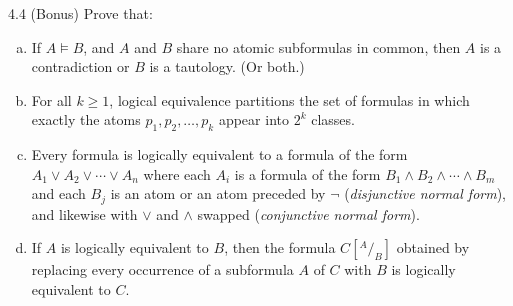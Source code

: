 \documentclass{article}
\begin{document}
\begin{prob}{4.4 (Bonus)}
    Prove that:
    \begin{enumerate}[a)]
    \item If $A \models B$, and $A$ and $B$ share no atomic subformulas in common, then $A$ is a contradiction or $B$ is a tautology. (Or both.)
    \item For all $k \geq 1$, logical equivalence partitions the set of formulas in which exactly the atoms $p_1, p_2, \dots, p_k$ appear into $2^k$ classes.
    \item Every formula is logically equivalent to a formula of the form $A_1 \vee A_2 \vee \cdots \vee A_n$ where each $A_i$ is a formula of the form $B_1 \wedge B_2 \wedge \cdots \wedge B_m$ and each $B_j$ is an atom or an atom preceded by $\neg$ (\emph{disjunctive normal form}), and likewise with $\vee$ and $\wedge$ swapped (\emph{conjunctive normal form}).
    \item If $A$ is logically equivalent to $B$, then the formula $C\left[^{A} / _{B} \right]$ obtained by replacing every occurrence of a subformula $A$ of $C$ with $B$ is logically equivalent to $C$.
    \end{enumerate}
\end{prob}
\end{document}
